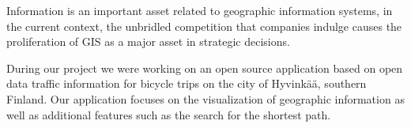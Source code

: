 







Information is an important asset related to geographic information systems, in the current context, the unbridled competition that companies indulge causes the proliferation of GIS as a major asset in strategic decisions.

During our project we were working on an open source application based on open data traffic information for bicycle trips on the city of Hyvinkää, southern Finland. Our application focuses on the visualization of geographic information as well as additional features such as the search for the shortest path.

